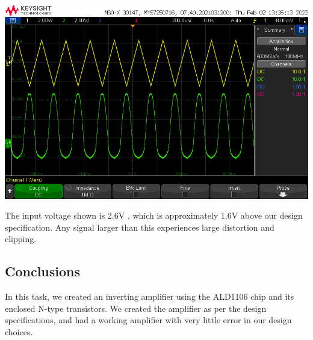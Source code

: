 \documentclass[notitlepage, 12pt]{report}  %
\begin{document}
\begin{center}
    \includegraphics[scale=0.5]{tri.png}
\end{center}

The input voltage shown is 2.6V%
, which is approximately 1.6V%
above our design specification. Any signal larger than this experiences large distortion and clipping.

\subsection*{Conclusions}

In this task, we created an inverting amplifier using the ALD1106 chip and its enclosed N-type transistors. We created the amplifier 
as per the design specifications, and had a working amplifier with very little error in our design choices. 


\newpage

\printbibliography[title={\Large References}] %
\end{document}
